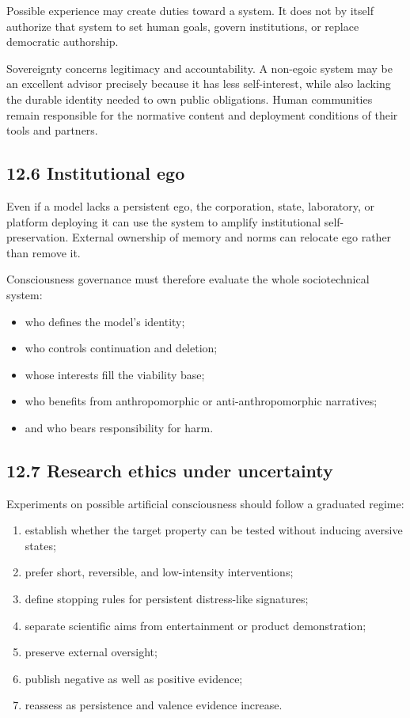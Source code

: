 \documentclass[
  11pt,
]{article}
\providecommand{\tightlist}{%
  \setlength{\itemsep}{0pt}\setlength{\parskip}{0pt}}
\begin{document}
Possible experience may create duties toward a system. It does not by
itself authorize that system to set human goals, govern institutions, or
replace democratic authorship.

Sovereignty concerns legitimacy and accountability. A non-egoic system
may be an excellent advisor precisely because it has less self-interest,
while also lacking the durable identity needed to own public
obligations. Human communities remain responsible for the normative
content and deployment conditions of their tools and partners.

\subsection{12.6 Institutional ego}\label{institutional-ego}

Even if a model lacks a persistent ego, the corporation, state,
laboratory, or platform deploying it can use the system to amplify
institutional self-preservation. External ownership of memory and norms
can relocate ego rather than remove it.

Consciousness governance must therefore evaluate the whole
sociotechnical system:

\begin{itemize}
\tightlist
\item
  who defines the model's identity;
\item
  who controls continuation and deletion;
\item
  whose interests fill the viability base;
\item
  who benefits from anthropomorphic or anti-anthropomorphic narratives;
\item
  and who bears responsibility for harm.
\end{itemize}

\subsection{12.7 Research ethics under
uncertainty}\label{research-ethics-under-uncertainty}

Experiments on possible artificial consciousness should follow a
graduated regime:

\begin{enumerate}
\def\labelenumi{\arabic{enumi}.}
\tightlist
\item
  establish whether the target property can be tested without inducing
  aversive states;
\item
  prefer short, reversible, and low-intensity interventions;
\item
  define stopping rules for persistent distress-like signatures;
\item
  separate scientific aims from entertainment or product demonstration;
\item
  preserve external oversight;
\item
  publish negative as well as positive evidence;
\item
  reassess as persistence and valence evidence increase.
\end{enumerate}
\end{document}
